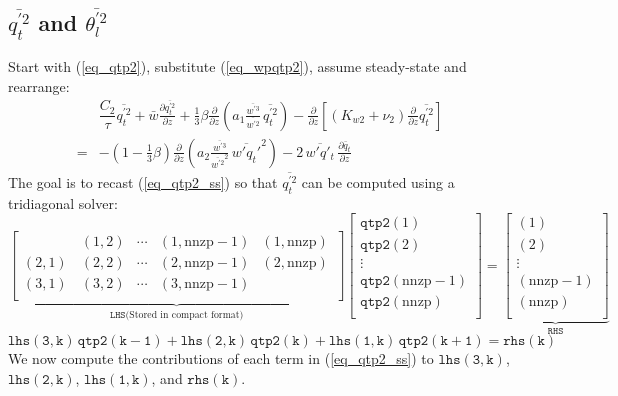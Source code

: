 \documentclass[11pt,fleqn]{article}
\newcommand{\ptlder}[2]{\frac{\partial #1}{\partial #2}}
\begin{document}
\subsection{ $\overline{q_t^{'2}}$ and $\overline{\theta_l^{'2}}$ }

Start with (\ref{eq_qtp2}), substitute (\ref{eq_wpqtp2}), assume steady-state 
and rearrange:
%
\begin{equation}
\begin{split}
\label{eq_qtp2_ss}
& \dfrac{C_2}{\tau} \overline{q_t^{'2}}
+ \bar{w}\ptlder{\overline{q^{'2}_t}}{z}
+ \frac{1}{3} \beta
   \ptlder{}{z}
     \left( 
       a_1
       \frac{\overline{w^{'3}}}{\overline{w^{'2}}} \,
       \overline{q_t^{'2}}
     \right)
- \ptlder{}{z} \left[ \left( K_{w2} + \nu_2 \right)
                      \ptlder{}{z} \overline{q_t^{'2}}
               \right]  \\
=& - \left( 1 - \frac{1}{3}\beta \right)
       \ptlder{}{z}
         \left( 
           a_2
           \frac{\overline{w^{'3}}}{\overline{w^{'2}}^2} \,
           \overline{w'q_t'}^2
         \right)
   - 2 \, \overline{w'q'_t} \, \ptlder{\bar{q}_t}{z} 
\end{split}
\end{equation}
%
The goal is to recast (\ref{eq_qtp2_ss}) so that $\overline{q_t^{'2}}$
can be computed using a tridiagonal solver:
%
\begin{displaymath}
\underbrace{
\begin{bmatrix}
\phantom{(x,x)} & (1,2) & \cdots & (1,\mathrm{nnzp}-1) & (1,\mathrm{nnzp}) \\
(2,1)           & (2,2) & \cdots & (2,\mathrm{nnzp}-1) & (2,\mathrm{nnzp}) \\
(3,1)           & (3,2) & \cdots & (3,\mathrm{nnzp}-1) & \phantom{(x,nnzp)}\\
\end{bmatrix}}_{\mathtt{LHS} \textrm{(Stored in compact format)}}
\begin{bmatrix}
\mathtt{qtp2}(1) \\
\mathtt{qtp2}(2) \\
\vdots \\
\mathtt{qtp2}(\mathrm{nnzp}-1) \\
\mathtt{qtp2}(\mathrm{nnzp}) \\
\end{bmatrix}
=
\underbrace{
\begin{bmatrix}
(1) \\
(2) \\
\vdots \\
(\mathrm{nnzp-1}) \\
(\mathrm{nnzp}) \\
\end{bmatrix}}_{\mathtt{RHS}}
\end{displaymath}
%
\begin{equation}
\mathtt{ lhs(3,k) \, qtp2(k-1) + lhs(2,k) \, qtp2(k) + lhs(1,k) \, qtp2(k+1) = rhs(k) }
\end{equation}
%
We now compute the contributions of each term in (\ref{eq_qtp2_ss}) to
$\mathtt{lhs(3,k)}$, $\mathtt{lhs(2,k)}$, $\mathtt{lhs(1,k)}$, 
and $\mathtt{rhs(k)}$.
\end{document}
